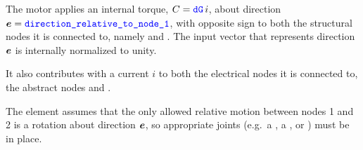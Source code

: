The motor applies an internal torque, $C = \textcolor{blue}{\texttt{dG}} \, i$, about direction
$\boldsymbol{e}=\textcolor{blue}{\texttt{direction\_relative\_to\_node\_1}}$, with opposite sign
to both the structural nodes it is connected to, namely  and .
The input vector that represents direction $\boldsymbol{e}$ is internally normalized to unity.

It also contributes with a current $i$ to both the electrical nodes it is connected to,
the abstract nodes  and .

The element assumes that the only allowed relative motion between nodes 1 and 2 is a rotation about direction $\boldsymbol{e}$,
so appropriate joints (e.g.\ a , a , or ) must be in place.



